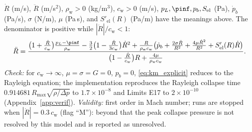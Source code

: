 $\dot R$ (m/s), $\ddot R$ (m/s$^2$), $\rho_{\mathrm w}>0$ (kg/m$^3$), $c_{\mathrm w}>0$ (m/s),
$p_L,\pinf,p_b,S_{\mathrm{el}}$ (Pa), $\dot p_b$ (Pa/s), $\sigma$ (N/m), $\mu$ (Pa\,s), and $S'_{\mathrm{el}}(R)$
(Pa/m) have the meanings above. The denominator is positive while $|\dot R|/c_{\mathrm w}<1$:
\begin{equation}
\ddot R=\frac{\bigl(1+\tfrac{\dot R}{c_{\mathrm w}}\bigr)\tfrac{p_L-\pinf}{\rho_{\mathrm w}}
-\tfrac32\bigl(1-\tfrac{\dot R}{3c_{\mathrm w}}\bigr)\dot R^2+\tfrac{R}{\rho_{\mathrm w}c_{\mathrm w}}
\bigl(\dot p_b+\tfrac{2\sigma\dot R}{R^2}+\tfrac{4\mu\dot R^2}{R^2}+S'_{\mathrm{el}}(R)\dot R\bigr)}
{\bigl(1-\tfrac{\dot R}{c_{\mathrm w}}\bigr)R+\tfrac{4\mu}{\rho_{\mathrm w}c_{\mathrm w}}} .\label{eq:km_explicit}
\end{equation}
\emph{Check:} for $c_{\mathrm w}\to\infty$, $\mu=\sigma=G=0$, $p_b=0$, \eqref{eq:km_explicit} reduces to
the Rayleigh equation; the implementation reproduces the Rayleigh collapse time
$0.914681\,R_{\max}\sqrt{\rho/\Delta p}$ to $1.7\times10^{-8}$ and Limits E17 to $2\times10^{-10}$
(Appendix~\ref{app:verif}). \emph{Validity:} first order in Mach number; runs are stopped when
$|\dot R|=0.3\,c_{\mathrm w}$ (flag ``M''): beyond that the peak collapse pressure is not resolved
by this model and is reported as unresolved.

